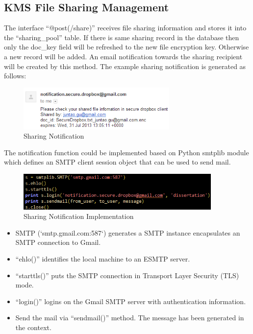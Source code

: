 \subsection{KMS File Sharing Management}

The interface ``@post(/share)'' receives file sharing information and stores it into the “sharing\_pool” table. If there is same sharing record in the database then only the doc\_key field will be refreshed to the new file encryption key. Otherwise a new record will be added. An email notification towards the sharing recipient will be created by this method. The example sharing notification is generated as follows:

\begin{figure}[!h]
        \centering
        \includegraphics[width=0.7\textwidth]{figures/Sharing_Notification.png}
        \caption[Sharing Notification] {Sharing Notification}
\end{figure}

The notification function could be implemented based on Python smtplib module which defines an SMTP client session object that can be used to send mail.

\begin{figure}[!h]
        \centering
        \includegraphics[width=0.9\textwidth]{figures/Sharing_Notification_Implementation.png}
        \caption[Sharing Notification Implementation] {Sharing Notification Implementation}
\end{figure}

\begin{itemize}
  \item
  SMTP (`smtp.gmail.com:587`) generates a SMTP instance encapsulates an SMTP connection to Gmail.
  \item
  ``ehlo()'' identifies the local machine to an ESMTP server.
  \item
  ``starttls()'' puts the SMTP connection in Transport Layer Security (TLS) mode.
  \item
  ``login()'' logins on the Gmail SMTP server with authentication information.
  \item
  Send the mail via ``sendmail()'' method. The message has been generated in the context.
\end{itemize}

